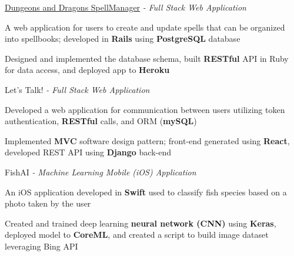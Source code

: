 \begin{siderulesProj}
\par\addvspace{-1.2ex}
\begin{cventriesproject}
  \cventryproject
  {\href{https://spellmanager-ah2lai.herokuapp.com/}{Dungeons and Dragons SpellManager} \hspace{0.15em}\bodyfontlight\itshape{- Full Stack Web Application}}
  {
    \begin{cvskillitems}
      \item {A web application for users to create and update spells that can be organized into spellbooks; developed in \textbf{Rails} using \textbf{PostgreSQL} database  }
      \item {Designed and implemented the database schema, built \textbf{RESTful} API in Ruby for data access, and deployed app to \textbf{Heroku}}
    \end{cvskillitems}
  }
  \cventryproject
    {Let's Talk!  \hspace{0.15em}\bodyfontlight\itshape{- Full Stack Web Application}}
    {
      \begin{cvskillitems}
        \item {Developed a web application for communication between users utilizing token authentication, \textbf{RESTful} calls, and ORM (\textbf{mySQL})}
        \item {Implemented \textbf{MVC} software design pattern; front-end generated using \textbf{React}, developed REST API using \textbf{Django} back-end}
      \end{cvskillitems}
    }
  \cventryproject
    {FishAI  \hspace{0.15em}\bodyfontlight\itshape{- Machine Learning Mobile (iOS) Application}}
    {
      \begin{cvskillitems}
        \item {An iOS application developed in \textbf{Swift} used to classify fish species based on a photo taken by the user}
        \item {Created and trained deep learning \textbf{neural network (CNN)} using \textbf{Keras}, deployed model to \textbf{CoreML}, and created a script to build image dataset leveraging Bing API}
      \end{cvskillitems}
    }
\end{cventriesproject}
\end{siderulesProj}
